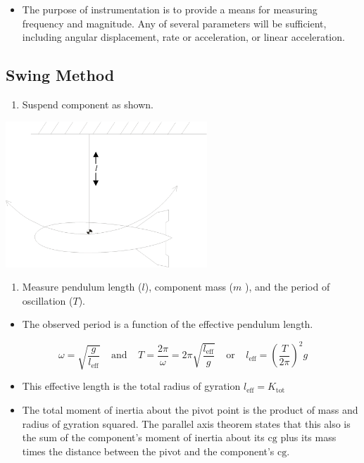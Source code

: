 \documentclass[
]{book}
\providecommand{\tightlist}{%
  \setlength{\itemsep}{0pt}\setlength{\parskip}{0pt}}
\begin{document}
\begin{itemize}
\tightlist
\item
  The purpose of instrumentation is to provide a means for measuring frequency and magnitude. Any of several parameters will be sufficient, including angular displacement, rate or acceleration, or linear acceleration.
\end{itemize}

\hypertarget{swing-method}{%
\subsection{Swing Method}\label{swing-method}}

\begin{enumerate}
\def\labelenumi{\arabic{enumi}.}
\tightlist
\item
  Suspend component as shown.
\end{enumerate}

\includegraphics[width=2.98264in,height=2.15625in]{media/07/image54.svg}~

\begin{enumerate}
\def\labelenumi{\arabic{enumi}.}
\setcounter{enumi}{1}
\tightlist
\item
  Measure pendulum length (\(l\)), component mass (\(m\) ), and the period of oscillation (\(T\)).
\end{enumerate}

\begin{itemize}
\tightlist
\item
  The observed period is a function of the effective pendulum length.
\end{itemize}

\[ \omega = \sqrt{\frac{g}{l_{\mathrm{eff}}}} \;\;\;\;\text{and}\;\;\;\; T = \frac{2 \pi}{\omega} = 2 \pi \sqrt{\frac{l_{\mathrm{eff}}}{g}} \;\;\;\;\text{or}\;\;\;\; l_{\mathrm{eff}} = \left( \frac{T}{2 \pi} \right)^2 g \]

\begin{itemize}
\tightlist
\item
  This effective length is the total radius of gyration \(l_{\mathrm{eff}} = K_{\mathrm{tot}}\)
\item
  The total moment of inertia about the pivot point is the product of mass and radius of gyration squared. The parallel axis theorem states that this also is the sum of the component's moment of inertia about its \(\mathrm{cg}\) plus its mass times the distance between the pivot and the component's \(\mathrm{cg}\).
\end{itemize}
\end{document}
